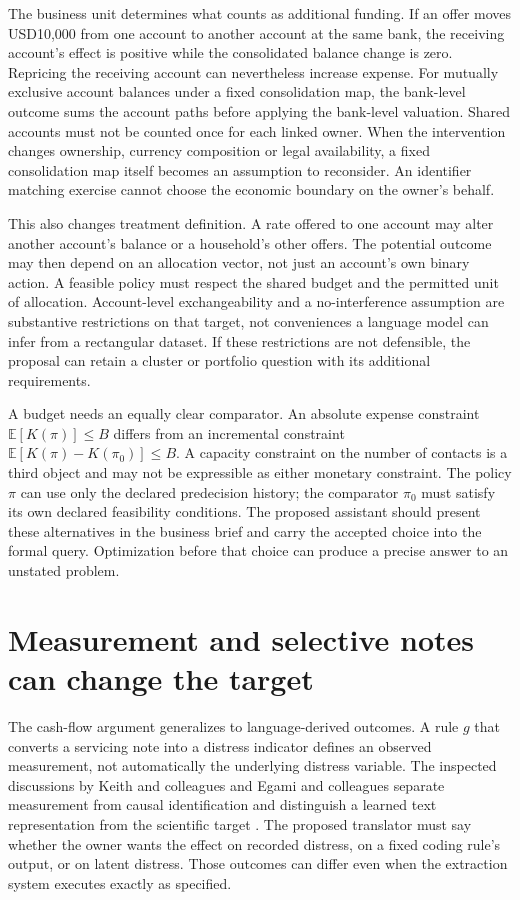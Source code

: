 The business unit determines what counts as additional funding. If an offer
moves USD10,000 from one account to another account at the same bank, the
receiving account's effect is positive while the consolidated balance change
is zero. Repricing the receiving account can nevertheless increase expense.
For mutually exclusive account balances under a fixed consolidation map,
the bank-level outcome sums the account paths before applying the bank-level
valuation. Shared accounts must not be counted once for each linked owner.
When the intervention changes ownership, currency composition or legal
availability, a fixed consolidation map itself becomes an assumption to
reconsider. An identifier matching exercise cannot choose the economic
boundary on the owner's behalf.

This also changes treatment definition. A rate offered to one account may
alter another account's balance or a household's other offers. The potential
outcome may then depend on an allocation vector, not just an account's own
binary action. A feasible policy must respect the shared budget and the
permitted unit of allocation. Account-level exchangeability and a
no-interference assumption are substantive restrictions on that target,
not conveniences a language model can infer from a rectangular dataset.
If these restrictions are not defensible, the proposal can retain a cluster
or portfolio question with its additional requirements.

A budget needs an equally clear comparator. An absolute expense constraint
$\mathbb E[K(\pi)]\leq B$ differs from an incremental constraint
$\mathbb E[K(\pi)-K(\pi_0)]\leq B$. A capacity constraint on the number of
contacts is a third object and may not be expressible as either monetary
constraint. The policy $\pi$ can use only the declared predecision history;
the comparator $\pi_0$ must satisfy its own declared feasibility conditions.
The proposed assistant should present these alternatives in the business
brief and carry the accepted choice into the formal query. Optimization
before that choice can produce a precise answer to an unstated problem.

\section{Measurement and selective notes can change the target}
\label{exec17:l2-measurement}

The cash-flow argument generalizes to language-derived outcomes. A rule
$g$ that converts a servicing note into a distress indicator defines an
observed measurement, not automatically the underlying distress variable.
The inspected discussions by Keith and colleagues and Egami and colleagues
separate measurement from causal identification and distinguish a learned
text representation from the scientific target
\citep{exec13_census_text_review_arxiv,exec13_census_texts}. The proposed
translator must say whether the owner wants the effect on recorded distress,
on a fixed coding rule's output, or on latent distress. Those outcomes can
differ even when the extraction system executes exactly as specified.

